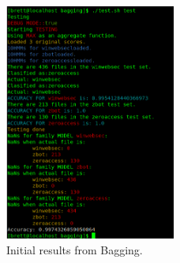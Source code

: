 \documentclass[12pt]{article}
\begin{document}
          \begin{figure}[H]
          \centering
          \includegraphics[width=0.5\textwidth]{bagging1.png}
          \caption{Initial results from Bagging.}
          \label{bagging1}
          \end{figure}
 
\end{document}
